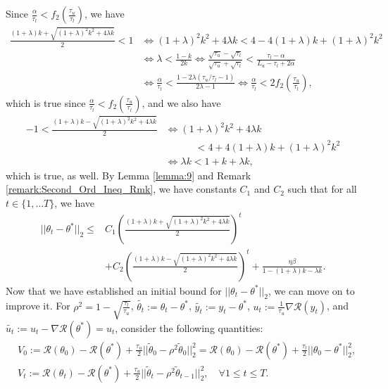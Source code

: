 \documentclass{article}
\begin{document}
Since $\frac{\alpha}{\tau_l} < f_2\left(\frac{\tau_u}{\tau_l}\right)$, we have
\begin{align*}
\frac{(1 + \lambda)k + \sqrt{(1 + \lambda)^2k^2 + 4\lambda k}}{2} < 1 &\iff (1 + \lambda)^2k^2 + 4\lambda k < 4 - 4(1 + \lambda)k + (1 + \lambda)^2k^2\\
&\iff \lambda < \frac{1 - k}{2k} \iff \frac{\sqrt{\tau_u} - \sqrt{\tau_l}}{\sqrt{\tau_u} + \sqrt{\tau_l}} < \frac{\tau_l - \alpha}{L_u - \tau_l + 2\alpha}\\
&\iff \frac{\alpha}{\tau_l} < \frac{1 - 2\lambda(\tau_u/\tau_l - 1)}{2\lambda - 1} \iff \frac{\alpha}{\tau_l} < 2f_2\left(\frac{\tau_u}{\tau_l}\right),
\end{align*}
which is true since $\frac{\alpha}{\tau_l} < f_2\left(\frac{\tau_u}{\tau_l}\right)$, and we also have 
\begin{align*}
-1 < \frac{(1 + \lambda)k - \sqrt{(1 + \lambda)^2k^2 + 4\lambda k}}{2} &\iff (1 + \lambda)^2k^2 + 4\lambda k\\
& \qquad \quad < 4 + 4(1 + \lambda)k + (1 + \lambda)^2k^2\\
&\iff \lambda k < 1 + k + \lambda k,
\end{align*}
which is true, as well. By Lemma \ref{lemma:9} and Remark \ref{remark:Second_Ord_Ineq_Rmk}, we have constants $C_1$ and $C_2$ such that for all $t \in \{1, \dots T\}$, we have
\begin{equation}
\label{eq:initb}
\begin{aligned}
||\theta_t - \theta^*||_2 \leq &C_1\left(\frac{(1 + \lambda)k + \sqrt{(1 + \lambda)^2k^2 + 4\lambda k}}{2}\right)^t\\
&+ C_2\left(\frac{(1 + \lambda)k - \sqrt{(1 + \lambda)^2k^2 + 4\lambda k}}{2}\right)^t + \frac{\eta\beta}{1 - (1 + \lambda)k - \lambda k}.
\end{aligned}
\end{equation}
Now that we have established an initial bound for $||\theta_t - \theta^*||_2$, we can move on to improve it. For $\rho^2 = 1 - \sqrt{\frac{\tau_l}{\tau_u}}$, $\widetilde{\theta_t} := \theta_t - \theta^*$, $\widetilde{y_t} := y_t - \theta^*$, $u_t:= \frac{1}{\tau_u}\nabla\mathcal{R}(y_t)$, and $\widetilde{u_t} := u_t - \nabla\mathcal{R}(\theta^*) = u_t$, consider the following quantities:
\begin{align*}
&V_0 := \mathcal{R}(\theta_0) - \mathcal{R}(\theta^*) + \frac{\tau_u}{2}||\widetilde{\theta}_0 - \rho^2\widetilde{\theta}_0||_2^2 = \mathcal{R}(\theta_0) - \mathcal{R}(\theta^*) + \frac{\tau_l}{2}||\theta_0 -\theta^*||_2^2, \\
&V_t := \mathcal{R}(\theta_t) - \mathcal{R}(\theta^*) + \frac{\tau_u}{2}||\widetilde{\theta}_t - \rho^2\widetilde{\theta}_{t - 1}||_2^2, \quad \forall 1 \le t \le T.
\end{align*}
\end{document}

